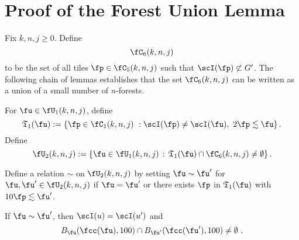 \section{Proof of the Forest Union Lemma}
\label{subsecforest}

Fix $k,n,j\ge 0$.
Define
$$
    \fC_6(k,n,j)
$$
to be the set of all tiles $\fp \in \fC_5(k,n,j)$ such that $\scI(\fp) \not\subset G'$. The following chain of lemmas
establishes that the set $\fC_6(k,n,j)$ can be written as a union of a small number of $n$-forests.

For $\fu\in \fU_1(k,n,j)$, define
\begin{equation}
    \label{eq-T1-def}
    \mathfrak{T}_1(\fu):= \{\fp \in \fC_1(k,n,j) \ : \scI(\fp)\neq \scI(\fu), \ 2\fp \lesssim \fu\}\,.
\end{equation}
Define
\begin{equation}
    \label{eq-U2-def}
    \fU_2(k,n,j) := \{ \fu \in \fU_1(k,n,j) \, : \, \mathfrak{T}_1(\fu) \cap \fC_6(k,n,j) \ne \emptyset\}\,.
\end{equation}

Define a relation $\sim$ on $\fU_2(k,n,j)$
by setting $\fu\sim \fu'$
for $\fu,\fu'\in \fU_2(k,n,j)$
if $\fu=\fu'$ or there exists $\fp$ in $\mathfrak{T}_1(\fu)$
with $10 \fp\lesssim \fu'$.

\begin{lemma}
    \label{relation-geometry}
    If $\fu \sim \fu'$, then $\scI(u) = \scI(u')$ and
    \begin{equation*}
        B_{\fu}(\fcc(\fu), 100) \cap B_{\fu'}(\fcc(\fu'), 100) \neq \emptyset\ .
    \end{equation*}
\end{lemma}

